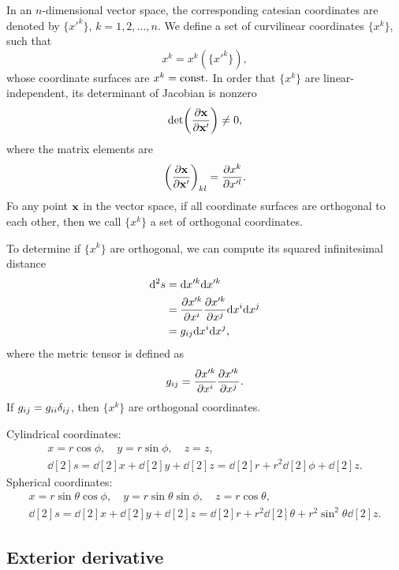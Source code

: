 \documentclass[10pt]{article}
\begin{document}
	In an $n$-dimensional vector space, the corresponding catesian coordinates are denoted by $\{ x'^k \}$, $k = 1,2, \dots, n$. We define a set of curvilinear coordinates $\{ x^k \}$, such that
	\begin{equation}
		x^k = x^k( \{ x'^k \} ),
	\end{equation}
	whose coordinate surfaces are $x^k = {\mathrm{const.}}$ In order that $\{ x^k \}$ are linear-independent, its determinant of Jacobian is nonzero
	\begin{equation}
		\det(\pdv{{\bf x}}{{\bf x}'}) \neq 0,
	\end{equation}
	where the matrix elements are
	\begin{equation}
		\pqty{\pdv{\bfx}{\bfx'}}_{k l} = \pdv{x^k}{x'^l}.
	\end{equation}
	Fo any point ${\bf x}$ in the vector space, if all coordinate surfaces are orthogonal to each other, then we call $\{ x^k \}$ a set of orthogonal coordinates.

	To determine if $\{ x^k \}$ are orthogonal, we can compute its squared infinitesimal distance
	\begin{align*}
		\dd[2]{s} &= \dd x'^k \dd x'^k \\
		&= \pdv{x'^k}{x^i} \pdv{x'^k}{x^j} \dd x^i \dd x^j \\
		&= g_{ij} \dd x^i \dd x^j,
	\end{align*}
	where the metric tensor is defined as
	\begin{equation}
		g_{ij} = \pdv{x'^k}{x^i} \pdv{x'^k}{x^j}.
	\end{equation}
	If $g_{ij} = g_{ii} \delta_{ij}$, then $\{ x^k \}$ are orthogonal coordinates.
	\begin{example}
		Cylindrical coordinates:
		\begin{gather}
			x = r \cos \phi, \quad y = r \sin \phi, \quad z = z, \\
			\dd[2]{s} = \dd[2]{x} + \dd[2]{y} + \dd[2]{z} = \dd[2]{r} + r^2 \dd[2]{\phi} + \dd[2]{z}.
		\end{gather}
		Spherical coordinates:
		\begin{gather}
			x = r \sin \theta \cos \phi, \quad y = r \sin \theta \sin \phi, \quad z = r \cos \theta, \\
			\dd[2]{s} = \dd[2]{x} + \dd[2]{y} + \dd[2]{z} = \dd[2]{r} + r^2 \dd[2]{\theta} + r^2 \sin^2{\theta} \dd[2]{z}.
		\end{gather}
	\end{example}
	\subsection{Exterior derivative}
\end{document}

